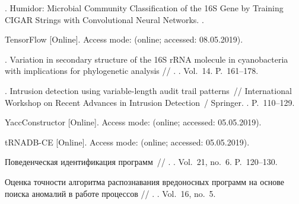 \begin{thebibliography}{10}
. Humidor: Microbial Community Classification of the
  16S Gene by Training CIGAR Strings with Convolutional Neural Networks.
  \BibDash
{}.

TensorFlow [Online]. \BibDash
\newblock Access mode:  (online; accessed:
  08.05.2019).

  .
Variation in secondary structure of the 16S rRNA molecule in cyanobacteria with
  implications for phylogenetic analysis // . \BibDash
{}. \BibDash
\newblock Vol.~14. \BibDash
\newblock P.~161--178.

. Intrusion detection
  using variable-length audit trail patterns~// International Workshop on
  Recent Advances in Intrusion Detection~/ Springer. \BibDash
{}. \BibDash
\newblock P.~110--129.

YaccConstructor [Online]. \BibDash
\newblock Access mode:  (online;
  accessed: 05.05.2019).

tRNADB-CE [Online]. \BibDash
\newblock Access mode:
   (online;
  accessed: 05.05.2019).

 Поведенческая
  идентификация программ~//
  . \BibDash
{}. \BibDash
\newblock Vol.~21, no.~6. \BibDash
\newblock P.~120--130.

Оценка точности алгоритма распознавания
  вредоносных программ на основе поиска
  аномалий в работе процессов // . \BibDash
{}. \BibDash
\newblock Vol.~16, no.~5.

\end{thebibliography}
